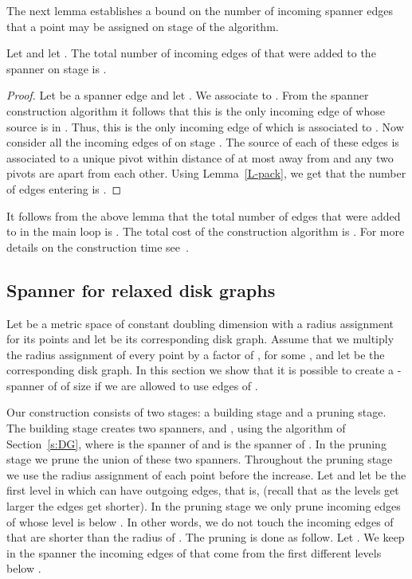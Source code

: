 \documentclass[proceedings]{stacs}
\theoremstyle{plain}\newtheorem{satz}[thm]{Satz}
\theoremstyle{definition}\newtheorem{crucial}[thm]{Crucial Definition}
\begin{document}
The next lemma establishes a bound on the number of incoming
spanner edges that a point may be assigned on stage  of the algorithm.

\begin{lemma}\label{L-level-size}
Let  and let .
The total number of incoming edges of  that were added to the
spanner on stage  is .
\end{lemma}
\begin{proof}
Let  be a spanner edge and let . We
associate  to . From the spanner construction algorithm
it follows that this is the only incoming edge of  whose source
is in . Thus, this is the only incoming edge of 
which is associated to . Now consider all the incoming edges of
 on stage . The source of each of these edges is associated
to a unique pivot within distance of at most 
away from  and any two pivots are  apart from
each other. Using Lemma~\ref{L-pack}, we get that the number of
edges entering  is .
\end{proof}

It follows from the above lemma that the total number of edges
that were added to  in the main loop is
. The total cost of the construction
algorithm is . For more details on the construction
time see~\cite{PeRo08}.

\subsection{Spanner for relaxed disk graphs}

Let  be a metric space of constant doubling dimension
 with a radius assignment  for its points and let
 be its corresponding disk graph. Assume that we
multiply the radius assignment of every point by a factor of
, for some , and let  be the
corresponding disk graph. In this section we show that it is
possible to create a -spanner of  of size
 if we are allowed to use edges of .

Our construction consists of two stages: a building stage and a
pruning stage. The building stage creates two spanners,  and
, using the algorithm of Section~\ref{s:DG}, where  is the
spanner of  and  is the spanner of . In the pruning
stage we prune the union of these two spanners. Throughout the
pruning stage we use the radius assignment of each point before
the increase. Let  and let  be the first level in
which  can have outgoing edges, that is,  (recall that as the levels get larger
the edges get shorter). In the pruning stage we only prune
incoming edges of  whose level is below . In other
words, we do not touch the incoming edges of  that are shorter
than the radius of . The pruning is done as follow. Let . We keep in the spanner the incoming
edges of  that come from the first  different levels
below .
\end{document}
